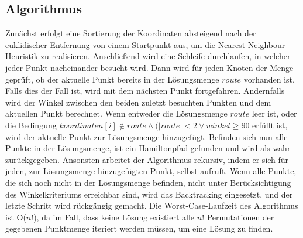 \documentclass[a4paper,10pt,ngerman]{scrartcl}
\begin{document}
    \subsection{Algorithmus}\label{subsec:algorithmus}

    Zunächst erfolgt eine Sortierung der Koordinaten absteigend nach der euklidischer Entfernung von einem Startpunkt aus,
    um die Nearest-Neighbour-Heuristik zu realisieren.
    Anschließend wird eine Schleife durchlaufen, in welcher jeder Punkt nacheinander besucht wird.
    Dann wird für jeden Knoten der Menge geprüft, ob der aktuelle Punkt bereits in der Lösungsmenge $route$ vorhanden ist.
    Falls dies der Fall ist, wird mit dem nächsten Punkt fortgefahren.
    Andernfalls wird der Winkel zwischen den beiden zuletzt besuchten Punkten und dem aktuellen Punkt berechnet.
    Wenn entweder die Lösungsmenge $route$ leer ist, oder die Bedingung $\textit{koordinaten}[i] \notin \textit{route} \land (|\textit{route}|<2 \lor \textit{winkel} \geq 90$ erfüllt ist,
    wird der aktuelle Punkt zur Lösungsmenge hinzugefügt.
    Befinden sich nun alle Punkte in der Lösungsmenge, ist ein Hamiltonpfad gefunden und wird als wahr zurückgegeben.
    Ansonsten arbeitet der Algorithmus rekursiv, indem er sich für jeden, zur Lösungsmenge hinzugefügten Punkt, selbst aufruft.
    Wenn alle Punkte, die sich noch nicht in der Lösungsmenge befinden, nicht unter Berücksichtigung des Winkelkriteriums erreichbar sind,
    wird das Backtracking eingesetzt, und der letzte Schritt wird rückgängig gemacht.
    Die Worst-Case-Laufzeit des Algorithmus ist O($n!$), da im Fall,
    dass keine Lösung existiert alle $n!$ Permutationen der gegebenen Punktmenge iteriert werden müssen, um eine Lösung zu finden.
\end{document}
